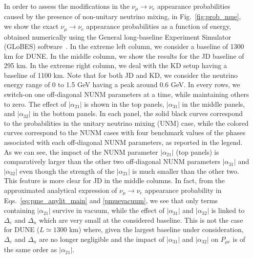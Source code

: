 \documentclass[11pt,a4paper]{article}
\newcommand{\ame}{\ensuremath{\alpha_{21}}}
\newcommand{\ate}{\ensuremath{\alpha_{31}}}
\newcommand{\atm}{\ensuremath{\alpha_{32}}}
\begin{document}
In order to assess the modifications in the $\nu_{\mu}\rightarrow\nu_{e}$ appearance probabilities caused by the presence of non-unitary neutrino mixing,
in Fig.~\ref{fig:prob_mue}, we show the exact  $\nu_{\mu}\rightarrow\nu_{e}$ appearance probabilities as a function of energy, obtained numerically using the General long-baseline Experiment Simulator (GLoBES) software~\cite{Huber:2004ka,Huber:2007ji}. In the extreme left column, we consider a baseline of 1300 km for DUNE. In the middle column, we show the results for the JD baseline of 295 km.
 In the extreme right column, we deal with the KD setup having a baseline of 1100 km. Note that for both JD and KD, we consider the neutrino energy range of 0 to 1.5 GeV having a peak around 0.6 GeV. In every rows, we switch-on one off-diagonal NUNM parameters  at a time, while maintaining  others to zero. The effect of $|\ame|$ is shown in the top panels, $|\ate|$ in the middle panels, and $|\atm|$ in the bottom panels. In each panel, the solid black curves correspond to the probabilities in the unitary neutrino mixing (UNM) case, while the colored curves correspond to the NUNM cases with four benchmark values of the phases associated with each off-diagonal NUNM parameters, as reported in the legend.
As we can see,  the impact of the NUNM parameter $|\ame|$ (top panels) is comparatively larger than the other two off-diagonal NUNM parameters $|\ate|$ and $|\atm|$ even though the strength of the $|\ame|$ is much smaller than the other two. This feature is more clear for JD in the middle columns. In fact,  from the approximated analytical expression of $\nu_{\mu}\rightarrow\nu_{e}$ appearance probability in Eqs.~\ref{eq:pme_anylit_main} and \ref{pmuevacuum}, we see that  only terms containing $|\ame|$ survive in vacuum, while the effect of $|\ate|$ and $|\atm|$ is linked to $\Delta_e$ and $\Delta_n$ which are very small at the considered baseline. This is not the case for DUNE ($L \simeq 1300$ km) where, given the largest baseline under consideration, $\Delta_e$ and $\Delta_n$ are no longer negligible and the impact of $|\ate|$ and $|\atm|$ on $P_{\mu e}$ is of the same order as $|\ame|$.
\end{document}
